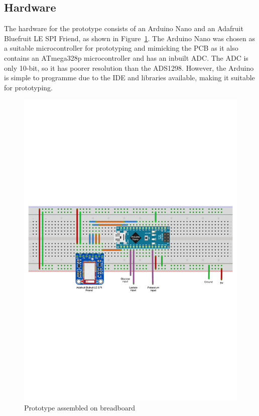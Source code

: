 \subsection{Hardware}
The hardware for the prototype consists of an Arduino Nano and an Adafruit Bluefruit LE SPI Friend, as shown in Figure~\ref{fig: breadboard}. The Arduino Nano was chosen as a suitable microcontroller for prototyping and mimicking the PCB as it also contains an ATmega328p microcontroller and has an inbuilt ADC. The ADC is only 10-bit, so it has poorer resolution than the ADS1298. However, the Arduino is simple to programme due to the IDE and libraries available, making it suitable for prototyping.

\begin{figure}[H]
\centering
\includegraphics[trim={0cm 10.5cm 0cm  10cm}, clip, width=1\textwidth]{./figures/Breadboard2.pdf}
\captionsetup{justification=centering}
\caption{Prototype assembled on breadboard}
\label{fig: breadboard}
\end{figure}

